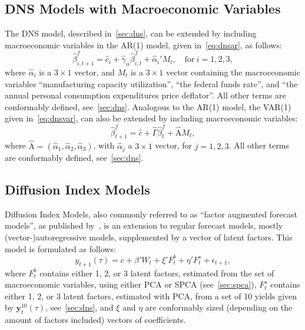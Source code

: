 \subsection{DNS Models with Macroeconomic Variables}
\label{sec:dnsmv}
The DNS model, described in~\cref{sec:dns}, can be extended by including macroeconomic variables in the AR(1) model, given in~\cref{eq:dnsar}, as follows:
\begin{equation}
	\hat{\beta}_{i,t+1}^{f} = \hat{c}_i + \hat{\gamma}_{ii} \hat{\beta}_{i,t}^f + \hat{\alpha}_i' M_t, \quad \text{for}~i = 1,2,3,
\end{equation}
where $\hat{\alpha}_i$ is a $3 \times 1$ vector, and $M_t$ is a $3 \times 1$ vector containing the macroeconomic variables \enquote{manufacturing capacity utilization}, \enquote{the federal funds rate}, and \enquote{the annual personal consumption expenditures price deflator}. All other terms are conformably defined, see~\cref{sec:dns}. Analogous to the AR(1) model, the VAR(1) given in~\cref{eq:dnsvar}, can also be extended by including macroeconomic variables:
\begin{equation}
	\hat{\beta}_{t+1}^{f} = \hat{c} + \hat{\Gamma} \hat{\beta}_t^f + \hat{\mathrm{A}} M_t,
\end{equation}
where $\hat{\mathrm{A}} = \left(\hat{\alpha}_1, \hat{\alpha}_2, \hat{\alpha}_3 \right)$, with $\hat{\alpha}_j$ a $3 \times 1$ vector, for $j = 1,2,3$. All other terms are conformably defined, see~\cref{sec:dns}.

\subsection{Diffusion Index Models}
\label{sec:dif}
Diffusion Index Models, also commonly referred to as \enquote{factor augmented forecast models}, as published by~\textcite[hereafter DIF]{Stock2002a,Stock2002b}, is an extension to regular forecast models, mostly (vector-)autoregressive models, supplemented by a vector of latent factors. This model is formulated as follows:
\begin{equation}
	y_{t+1}(\tau) = c + \beta' W_t + \xi' F_t^b + \eta' F_t^s + \epsilon_{t+1},
\end{equation}
where $F_t^b$ contains either 1, 2, or 3 latent factors, estimated from the set of macroeconomic variables, using either PCA or SPCA (see~\cref{sec:spca}), $F_t^s$ contains either 1, 2, or 3 latent factors, estimated with PCA, from a set of 10 yields given by $\mathbf{y}_t^{10}(\tau)$, see~\cref{sec:dns}, and $\xi$ and $\eta$ are conformably sized (depending on the amount of factors included) vectors of coefficients. 


